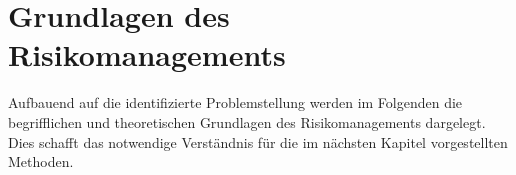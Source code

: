 \chapter{Grundlagen des Risikomanagements} \label{sec:grundlagen}
Aufbauend auf die identifizierte Problemstellung werden im Folgenden die begrifflichen und theoretischen Grundlagen des Risikomanagements dargelegt.
Dies schafft das notwendige Verständnis für die im nächsten Kapitel vorgestellten Methoden.



